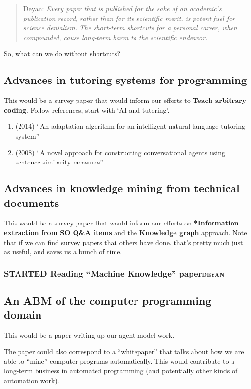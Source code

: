 \documentclass[11pt]{article}
\begin{document}
\begin{quote}
Deyan: \emph{Every paper that is published for the sake of an academic's publication record, rather than for its scientific merit, is potent fuel for science denialism. The short-term shortcuts for a personal career, when compounded, cause long-term harm to the scientific endeavor.}
\end{quote}

So, what can we do without shortcuts?

\subsection{Advances in tutoring systems for programming}
\label{sec:orgb7a2992}
This would be a survey paper that would inform our efforts to \textbf{Teach arbitrary coding}.
Follow references, start with ‘AI and tutoring’.

\begin{enumerate}
\item (2014) ``An adaptation algorithm for an intelligent natural language tutoring system''
\item (2008) ``A novel approach for constructing conversational agents using sentence similarity measures''
\end{enumerate}
\subsection{Advances in knowledge mining from technical documents}
\label{sec:org4c078ec}
This would be a survey paper that would inform our efforts on
\textbf{*Information extraction from SO Q\&A items} and the \textbf{Knowledge graph}
approach.  Note that if we can find survey papers that others have
done, that’s pretty much just as useful, and saves us a bunch of time.

\subsubsection{{\bfseries\sffamily STARTED} Reading ``Machine Knowledge'' paper\hfill{}\textsc{deyan}}
\label{sec:org6c128a0}
\subsection{An ABM of the computer programming domain}
\label{sec:org3747065}
This would be a paper writing up our agent model work.

The paper could also correspond to a “whitepaper” that talks about how
we are able to “mine” computer programs automatically.  This would
contribute to a long-term business in automated programming (and
potentially other kinds of automation work).
\end{document}
